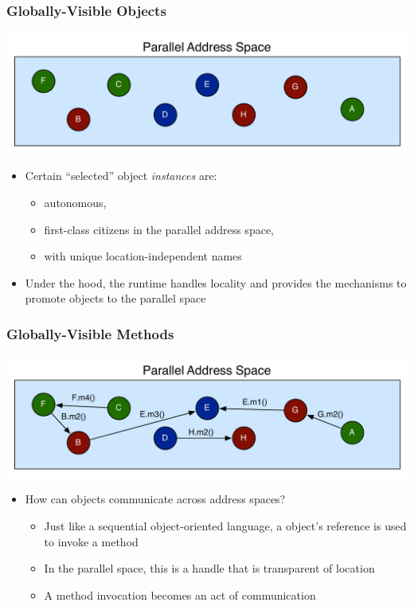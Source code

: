 \begin{frame}[fragile]
  \frametitle{Globally-Visible Objects}
  \begin{center}
    \includegraphics[width=\textwidth]{figures/objectGlobalAddress.pdf}
  \end{center}
  \begin{itemize}
    \item Certain ``selected'' object \emph{instances} are:
      \begin{itemize}
      \item autonomous,
      \item first-class citizens in the parallel address space,
      \item with unique location-independent names
      \end{itemize}
    \item Under the hood, the runtime handles locality and provides the
      mechanisms to promote objects to the parallel space
  \end{itemize}
\end{frame}

\begin{frame}[fragile]
  \frametitle{Globally-Visible Methods}
  \begin{center}
    \includegraphics[width=\textwidth]{figures/objectMethodGlobalAddress.pdf}
  \end{center}
  \begin{itemize}
    \item How can objects communicate across address spaces?
      \begin{itemize}
      \item Just like a sequential object-oriented language, a object's
        reference is used to invoke a method
      \item In the parallel space, this is a handle that is transparent of location
      \item A method invocation becomes an act of communication
      \end{itemize}
  \end{itemize}
\end{frame}

